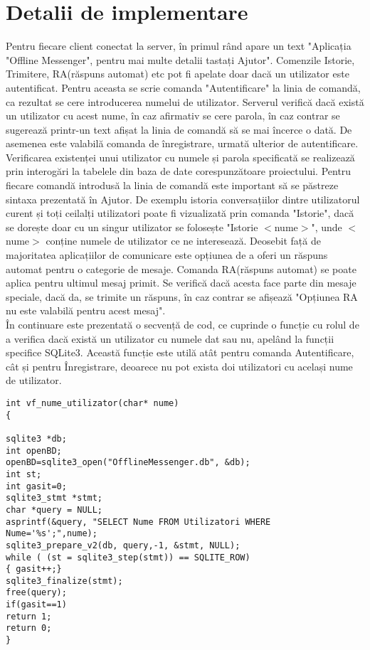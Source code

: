 \documentclass{article}
\begin{document}
\section{Detalii de implementare}
Pentru fiecare client conectat la server, în primul rând apare un text "Aplicația "Offline Messenger", pentru mai multe detalii tastați Ajutor". Comenzile Istorie, Trimitere, RA(răspuns automat) etc pot fi apelate doar dacă un utilizator este autentificat. Pentru aceasta se scrie comanda "Autentificare" la linia de comandă, ca rezultat se cere introducerea numelui de utilizator. Serverul verifică dacă există un utilizator cu acest nume, în caz afirmativ se cere parola, în caz contrar se sugerează printr-un text afișat la linia de comandă să se mai încerce o dată. De asemenea este valabilă comanda de înregistrare, urmată ulterior de autentificare. Verificarea existenței unui utilizator cu numele și parola specificată se realizează prin interogări la tabelele din baza de date corespunzătoare proiectului. Pentru fiecare comandă introdusă la linia de comandă este important să se păstreze sintaxa prezentată în Ajutor. De exemplu istoria conversațiilor dintre utilizatorul curent și toți ceilalți utilizatori poate fi vizualizată prin comanda "Istorie", dacă se dorește doar cu un singur utilizator se folosește "Istorie $<$nume$>$", unde $<$nume$>$ conține numele de utilizator ce ne interesează. Deosebit față de majoritatea aplicațiilor de comunicare este opțiunea de a oferi un răspuns automat pentru o categorie de mesaje. Comanda RA(răspuns automat) se poate aplica pentru ultimul mesaj primit. Se verifică dacă acesta face parte din mesaje speciale, dacă da, se trimite un răspuns, în caz contrar se afișează "Opțiunea RA nu este valabilă pentru acest mesaj".\\

În continuare este prezentată o secvență de cod, ce cuprinde o funcție cu rolul de a verifica dacă există un utilizator cu numele dat sau nu, apelând la funcții specifice SQLite3. Această funcție este utilă atât pentru comanda Autentificare, cât și pentru Înregistrare, deoarece nu pot exista doi utilizatori cu același nume de utilizator.\\
\begin{lstlisting}
int vf_nume_utilizator(char* nume)
{

sqlite3 *db;
int openBD;
openBD=sqlite3_open("OfflineMessenger.db", &db);
int st;
int gasit=0;
sqlite3_stmt *stmt;
char *query = NULL;
asprintf(&query, "SELECT Nume FROM Utilizatori WHERE 
Nume='%s';",nume);   	    
sqlite3_prepare_v2(db, query,-1, &stmt, NULL);
while ( (st = sqlite3_step(stmt)) == SQLITE_ROW) 
{ gasit++;}
sqlite3_finalize(stmt);
free(query); 
if(gasit==1)
return 1;
return 0;
}
\end{lstlisting}
\end{document}
